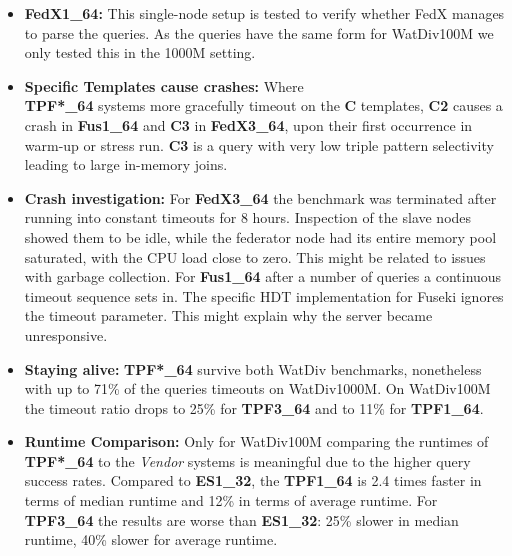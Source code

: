 \begin{itemize}
	\item \textbf{FedX1\_64:} This single-node setup is tested to verify whether FedX manages to parse the queries. As the queries have the same form for WatDiv100M we only tested this in the 1000M setting.
	\item \textbf{Specific Templates cause crashes:} Where \\ \textbf{TPF*\_64} systems more gracefully timeout on the \textbf{C} templates, \textbf{C2} causes a crash in \textbf{Fus1\_64} and \textbf{C3} in \textbf{FedX3\_64}, upon their first occurrence in warm-up or stress run. \textbf{C3} is a query with very low triple pattern selectivity leading to large in-memory joins.
	\item \textbf{Crash investigation:} For \textbf{FedX3\_64} the benchmark was terminated after running into constant timeouts for 8 hours. Inspection of the slave nodes showed them to be idle, while the federator node had its entire memory pool saturated, with the CPU load close to zero. This might be related to issues with garbage collection.
	For \textbf{Fus1\_64} after a number of queries a continuous timeout sequence sets in. The specific HDT implementation for Fuseki ignores the timeout parameter. This might explain why the server became unresponsive.
	\item \textbf{Staying alive:} \textbf{TPF*\_64} survive both WatDiv benchmarks, nonetheless with up to 71\% of the queries timeouts on WatDiv1000M. On WatDiv100M the timeout ratio drops to 25\% for \textbf{TPF3\_64} and to 11\% for \textbf{TPF1\_64}.
%
	\item \textbf{Runtime Comparison: } Only for WatDiv100M comparing the runtimes of \textbf{TPF*\_64} to the \emph{Vendor} systems is meaningful due to the higher query success rates. Compared to \textbf{ES1\_32}, the \textbf{TPF1\_64} is 2.4 times faster in terms of median runtime and 12\% in terms of average runtime. For \textbf{TPF3\_64} the results are worse than \textbf{ES1\_32}: 25\% slower in median runtime, 40\% slower for average runtime.
\end{itemize}









